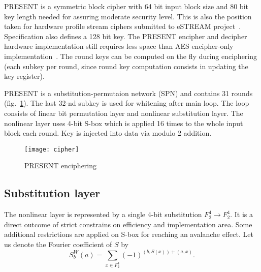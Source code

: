 PRESENT is a symmetric block cipher with 64 bit input block size and 80 bit
key length needed for assuring moderate security level. This is also the
position taken for hardware profile stream ciphers submitted to eSTREAM
project~\cite{estream}. Specification also defines a 128 bit key. The
PRESENT encipher and decipher hardware implementation still requires less
space than AES encipher-only implementation~\cite{lwc:lounge}. The round
keys can be computed on the fly during enciphering (each subkey per round, since
round key computation consists in updating the key register).

PRESENT is a substitution-permutaion network (SPN) and contains 31 rounds
(fig.~\ref{fig:present-cipher}).
The last 32-nd subkey is used for whitening after main loop. The loop consists
of linear bit permutation layer and nonlinear substitution layer. The nonlinear
layer uses 4-bit S-box which is applied 16 times to the whole input block each
round. Key is injected into data via modulo 2 addition.

\begin{figure}[htbp]
    \centering
    \texttt{[image: cipher]}
    \caption{PRESENT enciphering}
    \label{fig:present-cipher}
\end{figure}

\subsection{Substitution layer}

The nonlinear layer is represented by a single 4-bit substitution 
$ F_2^4 \rightarrow F_2^4 $. It is a direct outcome of strict constrains on
efficiency and implementation area. Some additional restrictions are applied on
S-box for reaching an avalanche effect. Let us denote the Fourier coefficient of
$ S $ by
\begin{equation}
    S_b^W(a) = \sum\limits_{x \in F_2^4} (-1)^{(b,  S(x)) + (a,  x)}.
\end{equation}

